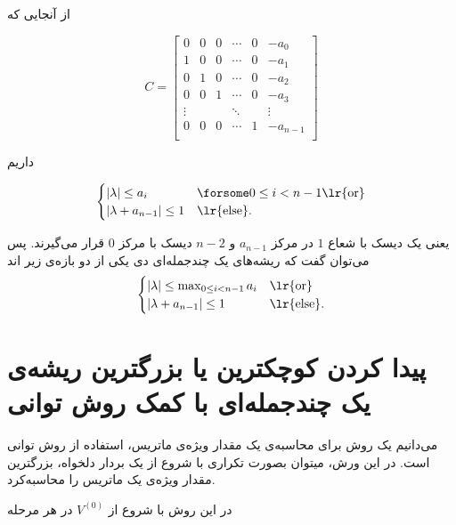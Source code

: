 از آنجایی که

\begin{equation}
  C =
    \begin{bmatrix}
      0 & 0 & 0 & \cdots & 0 & -a_0 \\
      1 & 0 & 0 & \cdots & 0 & -a_1 \\
      0 & 1 & 0 & \cdots & 0 & -a_2 \\
      0 & 0 & 1 & \cdots & 0 & -a_3 \\
      \vdots &  &  & \ddots & & \vdots \\
      0 & 0 & 0 & \cdots & 1 & -a_{n-1} \\

    \end{bmatrix}
\end{equation}

داریم

\begin{equation}
  \begin{cases}
    | \lambda | \le a_i & \forsome 0 \le i < n - 1 \text{\lr{or}} \\
    | \lambda + a_{n-1} | \le 1 & \text{\lr{else}}.
  \end{cases}
\end{equation}

یعنی یک دیسک با شعاع
$1$
در مرکز
$a_{n-1}$
و
$n-2$
دیسک با مرکز
$0$
قرار می‌گیرند.
پس می‌توان گفت که ریشه‌های یک چندجمله‌ای دی یکی از دو بازه‌ی زیر اند
\begin{equation}
  \begin{cases}
    | \lambda | \le \max_{0 \le i < n - 1} a_i & \text{\lr{or}} \\
    | \lambda + a_{n-1} | \le 1 & \text{\lr{else}}.
  \end{cases}
\end{equation}



\section{پیدا کردن کوچکترین یا بزرگترین ریشه‌ی یک چندجمله‌ای با کمک روش توانی}

می‌دانیم یک روش برای محاسبه‌ی یک مقدار ویژه‌ی ماتریس، استفاده از روش توانی است.
در این ورش، میتوان بصورت تکراری با شروع از یک بردار دلخواه، بزرگترین مقدار ویژه‌ی یک ماتریس را محاسبه‌کرد.

در این روش با شروع از
$V^{(0)}$
در هر مرحله

